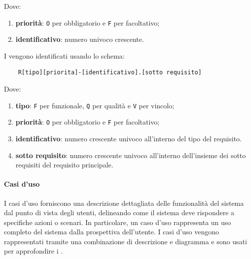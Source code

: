 Dove:
\begin{enumerate}
    \item \textbf{priorità}: \lstinline{O} per obbligatorio e \lstinline{F} per facoltativo;
    \item \textbf{identificativo}: numero univoco crescente.
\end{enumerate}
I  vengono identificati usando lo schema:
\begin{lstlisting}
    R[tipo][priorita]-[identificativo].[sotto requisito] 
\end{lstlisting}
Dove:
\begin{enumerate}
    \item \textbf{tipo}: \lstinline{F} per funzionale, \lstinline{Q} per qualità e \lstinline{V} per vincolo;
    \item \textbf{priorità}: \lstinline{O} per obbligatorio e \lstinline{F} per facoltativo;
    \item \textbf{identificativo}: numero crescente univoco all'interno del tipo del requisito.
    \item \textbf{sotto requisito}: numero crescente univoco all'interno dell'insieme dei sotto requisiti del requisito principale.
\end{enumerate}


\paragraph{Casi d'uso}
\label{par:casi_uso}
I casi d'uso forniscono una descrizione dettagliata delle funzionalità del sistema dal punto di vista degli utenti, delineando come il sistema deve rispondere a specifiche azioni o scenari. 
In particolare, un caso d'uso rappresenta un uso completo del sistema dalla prospettiva dell'utente.
I casi d'uso vengono rappresentati tramite una combinazione di descrizione e diagramma  e sono usati per approfondire i .

